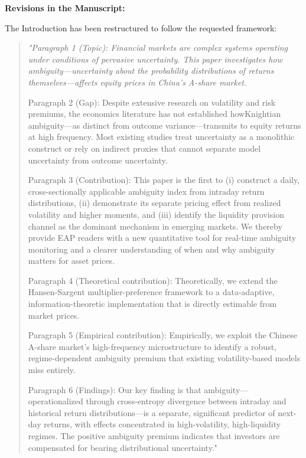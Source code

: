 \documentclass[12pt]{article}
\begin{document}
\begin{highlightbox}
\textbf{Revisions in the Manuscript:}

The Introduction has been restructured to follow the requested framework:
\vspace{0.2cm}
\begin{quote}
\itshape "Paragraph 1 (Topic): Financial markets are complex systems operating under conditions of pervasive uncertainty. This paper investigates how ambiguity---uncertainty about the probability distributions of returns themselves---affects equity prices in China's A-share market.\par
Paragraph 2 (Gap): Despite extensive research on volatility and risk premiums, the economics literature has not established howKnightian ambiguity---as distinct from outcome variance---transmits to equity returns at high frequency. Most existing studies treat uncertainty as a monolithic construct or rely on indirect proxies that cannot separate model uncertainty from outcome uncertainty.\par
Paragraph 3 (Contribution): This paper is the first to (i) construct a daily, cross-sectionally applicable ambiguity index from intraday return distributions, (ii) demonstrate its separate pricing effect from realized volatility and higher moments, and (iii) identify the liquidity provision channel as the dominant mechanism in emerging markets. We thereby provide EAP readers with a new quantitative tool for real-time ambiguity monitoring and a clearer understanding of when and why ambiguity matters for asset prices.\par
Paragraph 4 (Theoretical contribution): Theoretically, we extend the Hansen-Sargent multiplier-preference framework to a data-adaptive, information-theoretic implementation that is directly estimable from market prices.\par
Paragraph 5 (Empirical contribution): Empirically, we exploit the Chinese A-share market's high-frequency microstructure to identify a robust, regime-dependent ambiguity premium that existing volatility-based models miss entirely.\par
Paragraph 6 (Findings): Our key finding is that ambiguity---operationalized through cross-entropy divergence between intraday and historical return distributions---is a separate, significant predictor of next-day returns, with effects concentrated in high-volatility, high-liquidity regimes. The positive ambiguity premium indicates that investors are compensated for bearing distributional uncertainty."
\end{quote}
\end{highlightbox}
\end{document}
